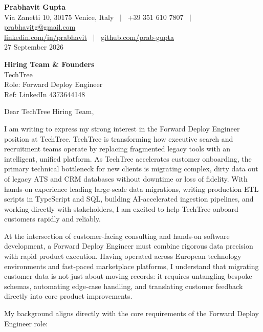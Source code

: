 \documentclass[10.5pt,a4paper]{article}
\begin{document}
\textbf{\large Prabhavit Gupta}\\
Via Zanetti 10, 30175 Venice, Italy ~$\vert$~ +39 351 610 7807 ~$\vert$~ \href{mailto:prabhavitg@gmail.com}{prabhavitg@gmail.com}\\
\href{https://www.linkedin.com/in/prabhavit/}{linkedin.com/in/prabhavit} ~$\vert$~ \href{https://github.com/prab-gupta}{github.com/prab-gupta}\\
27 September 2026

\textbf{Hiring Team \& Founders}\\
TechTree\\
Role: Forward Deploy Engineer\\
Ref: LinkedIn 4373644148

Dear TechTree Hiring Team,

I am writing to express my strong interest in the Forward Deploy Engineer position at TechTree. TechTree is transforming how executive search and recruitment teams operate by replacing fragmented legacy tools with an intelligent, unified platform. As TechTree accelerates customer onboarding, the primary technical bottleneck for new clients is migrating complex, dirty data out of legacy ATS and CRM databases without downtime or loss of fidelity. With hands-on experience leading large-scale data migrations, writing production ETL scripts in TypeScript and SQL, building AI-accelerated ingestion pipelines, and working directly with stakeholders, I am excited to help TechTree onboard customers rapidly and reliably.

At the intersection of customer-facing consulting and hands-on software development, a Forward Deploy Engineer must combine rigorous data precision with rapid product execution. Having operated across European technology environments and fast-paced marketplace platforms, I understand that migrating customer data is not just about moving records: it requires untangling bespoke schemas, automating edge-case handling, and translating customer feedback directly into core product improvements.

My background aligns directly with the core requirements of the Forward Deploy Engineer role:
\end{document}
